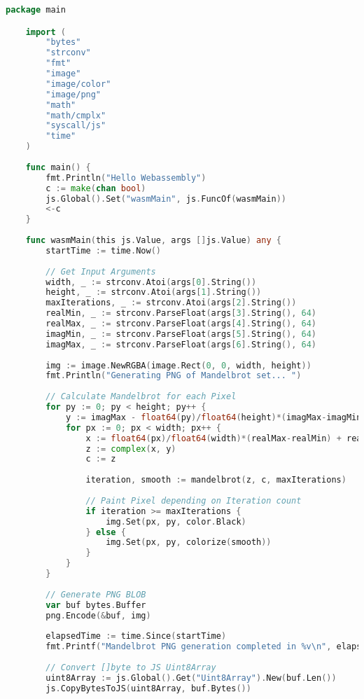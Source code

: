 \begin{lstlisting}[language=go, frame=tb, caption={Mandelbrot Set Calculation (WASM build)}]
    package main

    import (
        "bytes"
        "strconv"
        "fmt"
        "image"
        "image/color"
        "image/png"
        "math"
        "math/cmplx"
        "syscall/js"
        "time"
    )
    
    func main() {
        fmt.Println("Hello Webassembly")
        c := make(chan bool)
        js.Global().Set("wasmMain", js.FuncOf(wasmMain))
        <-c
    }
    
    func wasmMain(this js.Value, args []js.Value) any {
        startTime := time.Now()
    
        // Get Input Arguments
        width, _ := strconv.Atoi(args[0].String())
        height, _ := strconv.Atoi(args[1].String())
        maxIterations, _ := strconv.Atoi(args[2].String())
        realMin, _ := strconv.ParseFloat(args[3].String(), 64)
        realMax, _ := strconv.ParseFloat(args[4].String(), 64)
        imagMin, _ := strconv.ParseFloat(args[5].String(), 64)
        imagMax, _ := strconv.ParseFloat(args[6].String(), 64)
    
        img := image.NewRGBA(image.Rect(0, 0, width, height))
        fmt.Println("Generating PNG of Mandelbrot set... ")
    
        // Calculate Mandelbrot for each Pixel
        for py := 0; py < height; py++ {
            y := imagMax - float64(py)/float64(height)*(imagMax-imagMin)
            for px := 0; px < width; px++ {
                x := float64(px)/float64(width)*(realMax-realMin) + realMin
                z := complex(x, y)
                c := z
    
                iteration, smooth := mandelbrot(z, c, maxIterations)
    
                // Paint Pixel depending on Iteration count
                if iteration >= maxIterations {
                    img.Set(px, py, color.Black)
                } else {
                    img.Set(px, py, colorize(smooth))
                }
            }
        }
    
        // Generate PNG BLOB
        var buf bytes.Buffer
        png.Encode(&buf, img)
    
        elapsedTime := time.Since(startTime)
        fmt.Printf("Mandelbrot PNG generation completed in %v\n", elapsedTime)
    
        // Convert []byte to JS Uint8Array
        uint8Array := js.Global().Get("Uint8Array").New(buf.Len())
        js.CopyBytesToJS(uint8Array, buf.Bytes())
    

\end{lstlisting}

